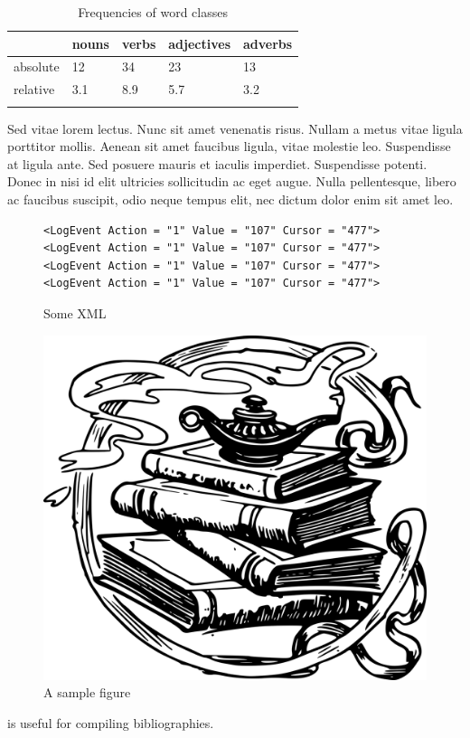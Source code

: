 \begin{table}
\caption{Frequencies of word classes}
\label{tab:1:frequencies}
 \begin{tabular}{lllll} %
  \lsptoprule
            & nouns & verbs & adjectives & adverbs\\ %
  \midrule
  absolute  &   12 &    34  &    23     & 13\\
  relative  &   3.1 &   8.9 &    5.7    & 3.2\\
  \lspbottomrule
 \end{tabular}
\end{table}


Sed vitae lorem lectus. Nunc sit amet venenatis risus. Nullam a metus vitae ligula porttitor mollis. Aenean sit amet faucibus ligula, vitae molestie leo. Suspendisse at ligula ante. Sed posuere mauris et iaculis imperdiet. Suspendisse potenti. Donec in nisi id elit ultricies sollicitudin ac eget augue. Nulla pellentesque, libero ac faucibus suscipit, odio neque tempus elit, nec dictum dolor enim sit amet leo. 

\begin{figure}
\caption{Some XML}
\begin{lstlisting}
<LogEvent Action = "1" Value = "107" Cursor = "477">
<LogEvent Action = "1" Value = "107" Cursor = "477">
<LogEvent Action = "1" Value = "107" Cursor = "477">
<LogEvent Action = "1" Value = "107" Cursor = "477">
\end{lstlisting}
\end{figure}


\begin{figure}
  \includegraphics[width=\textwidth]{figures/samplefigure.png}
  \caption{\label{fig:samplefigure}A sample figure}
\end{figure}

 
\citet{Nordhoff2018} is useful for compiling bibliographies.
